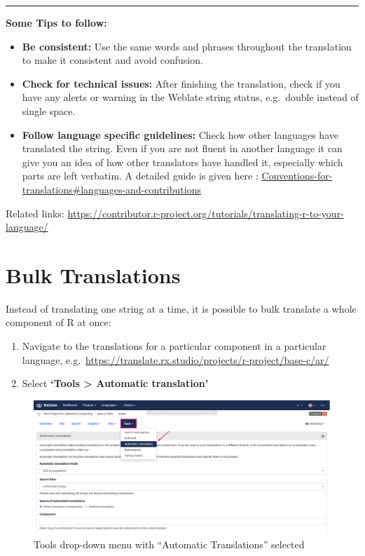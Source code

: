 \documentclass[
]{book}
\begin{document}
\begin{center}\rule{0.5\linewidth}{0.5pt}\end{center}

\textbf{Some Tips to follow:}

\begin{itemize}
\item
  \textbf{Be consistent:} Use the same words and phrases throughout the
  translation to make it consistent and avoid confusion.
\item
  \textbf{Check for technical issues:} After finishing the translation,
  check if you have any alerts or warning in the Weblate string
  status, e.g.~double instead of single space.
\item
  \textbf{Follow language specific guidelines:} Check how other languages
  have translated the string. Even if you are not fluent in another
  language it can give you an idea of how other translators have
  handled it, especially which parts are left verbatim. A detailed
  guide is given here :
  \href{https://contributor.r-project.org/translations/Conventions_for_Languages/\#languages-and-contributions}{Conventions-for-translations\#languages-and-contributions}
\end{itemize}

Related links:
\url{https://contributor.r-project.org/tutorials/translating-r-to-your-language/}

\section{Bulk Translations}\label{bulk-translations}

Instead of translating one string at a time, it is possible to bulk translate a whole component of R at once:

\begin{enumerate}
\def\labelenumi{\arabic{enumi}.}
\item
  Navigate to the translations for a particular component in a particular language, e.g.~\url{https://translate.rx.studio/projects/r-project/base-c/ar/}
\item
  Select \textbf{`Tools \textgreater{} Automatic translation'}
\end{enumerate}

\begin{figure}
\centering
\includegraphics{img/translate_automatic_translation.png}
\caption{Tools drop-down menu with ``Automatic Translations'' selected}
\end{figure}
\end{document}
